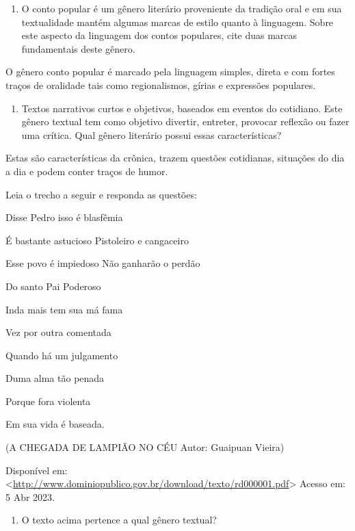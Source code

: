 
\begin{enumerate}
\def\labelenumi{\arabic{enumi})}
\tightlist
\item
  O conto popular é um gênero literário proveniente da tradição oral e
  em sua textualidade mantém algumas marcas de estilo quanto à
  linguagem. Sobre este aspecto da linguagem dos contos populares, cite
  duas marcas fundamentais deste gênero.
\end{enumerate}

O gênero conto popular é marcado pela linguagem simples, direta e com
fortes traços de oralidade tais como regionalismos, gírias e expressões
populares.

\begin{enumerate}
\def\labelenumi{\arabic{enumi})}
\setcounter{enumi}{1}
\tightlist
\item
  Textos narrativos curtos e objetivos, baseados em eventos do
  cotidiano. Este gênero textual tem como objetivo divertir, entreter,
  provocar reflexão ou fazer uma crítica. Qual gênero literário possui
  essas características?
\end{enumerate}

Estas são características da crônica, trazem questões cotidianas,
situações do dia a dia e podem conter traços de humor.

Leia o trecho a seguir e responda as questões:

Disse Pedro isso é blasfêmia

É bastante astucioso Pistoleiro e cangaceiro

Esse povo é impiedoso Não ganharão o perdão

Do santo Pai Poderoso

Inda mais tem sua má fama

Vez por outra comentada

Quando há um julgamento

Duma alma tão penada

Porque fora violenta

Em sua vida é baseada.

(A CHEGADA DE LAMPIÃO NO CÉU Autor: Guaipuan Vieira)

Disponível em:
\textless{}\href{http://www.dominiopublico.gov.br/download/texto/rd000001.pdf}{\uline{http://www.dominiopublico.gov.br/download/texto/rd000001.pdf}}\textgreater{}
Acesso em: 5 Abr 2023.

\begin{enumerate}
\def\labelenumi{\arabic{enumi})}
\setcounter{enumi}{2}
\tightlist
\item
  O texto acima pertence a qual gênero textual?
\end{enumerate}

